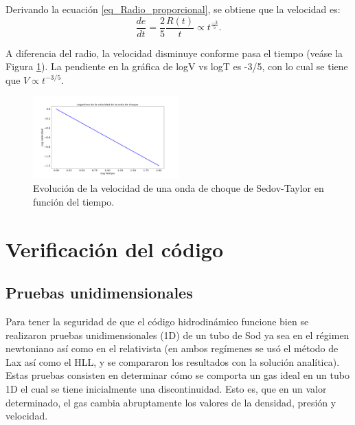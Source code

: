\documentclass[12pt,a4paper]{book}
\begin{document}
Derivando la ecuación \ref{eq_Radio_proporcional}, se obtiene que la velocidad es:
\begin{equation}
  \dfrac{de}{dt} = \frac{2}{5}\frac{R(t)}{t} \varpropto t^{\frac{-3}{5}}.
\end{equation}

\noindent A diferencia del radio, la velocidad disminuye conforme pasa el tiempo (veáse la Figura \ref{fig_velocidad_vs_radio}). La pendiente en la gráfica de logV vs logT es -3/5, con lo cual se tiene que $V \propto t^{-3/5}$.

\begin{figure}
  \centering
    \includegraphics[width=0.5\textwidth]{Figuras/capitulo_2/Velocidad_vs_tiempo.png}
  \caption{Evolución de la velocidad de una onda de choque de Sedov-Taylor en función del tiempo.} \label{fig_velocidad_vs_radio}
\end{figure}




\chapter{Verificación del código}\label{cap:Verificacion_del_codigo}


\section{Pruebas unidimensionales}

Para tener la seguridad de que el código hidrodinámico funcione bien se realizaron pruebas  unidimensionales (1D)
de un tubo de Sod ya sea en el régimen newtoniano así como en el relativista (en ambos regímenes se usó
el método de Lax así como el HLL, y se compararon los resultados con la solución analítica). 
Estas pruebas consisten en determinar cómo se comporta un gas ideal en un tubo 1D 
el cual se tiene inicialmente una discontinuidad. Esto es, que en un valor determinado,
el gas cambia abruptamente los valores de la densidad, presión y velocidad.
\end{document}

